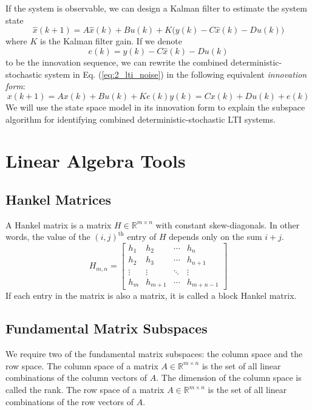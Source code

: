 If the system is observable, we can design a Kalman filter to estimate the system state \cite{kalman1960new}
\begin{equation*}
\hat{x}(k+1) = A\hat{x}(k) + Bu(k) + K\big(y(k) - C\hat{x}(k) - Du(k)\big)
\end{equation*}
where $K$ is the Kalman filter gain. If we denote 
\begin{equation*}
e(k) = y(k) - C\hat{x}(k) - Du(k)
\end{equation*}
to be the innovation sequence, we can rewrite the combined deterministic-stochastic system in Eq. (\ref{eq:2_lti_noise}) in the following equivalent \textit{innovation form}:
\begin{subequations}\label{eq:2_innovation}
\begin{equation}x(k+1) = Ax(k) + Bu(k) + Ke(k)\end{equation}
\begin{equation}y(k) = Cx(k) + Du(k) + e(k)\end{equation}
\end{subequations}
We will use the state space model in its innovation form to explain the subspace algorithm for identifying combined deterministic-stochastic LTI systems.


\section{Linear Algebra Tools}

\subsection{Hankel Matrices}
A Hankel matrix is a matrix $H \in \mathbb{R}^{m\times n}$ with constant skew-diagonals. In other words, the value of the $(i, j)^{\mbox{th}}$ entry of $H$ depends only on the sum $i + j$.
\begin{equation*}
H_{m,n} = \begin{bmatrix}
h_1 & h_2 & \cdots & h_n\\
h_2 & h_3 & \cdots & h_{n+1}\\
\vdots & \vdots & \ddots & \vdots\\
h_m & h_{m+1} & \cdots & h_{m+n-1}
\end{bmatrix}
\end{equation*}
If each entry in the matrix is also a matrix, it is called a block Hankel matrix.


\subsection{Fundamental Matrix Subspaces}
We require two of the fundamental matrix subspaces: the column space and the row space. The column space of a matrix $A \in \mathbb{R}^{m\times n}$ is the set of all linear combinations of the column vectors of $A$. The dimension of the column space is called the rank. The row space of a matrix $A \in \mathbb{R}^{m\times n}$ is the set of all linear combinations of the row vectors of $A$.


